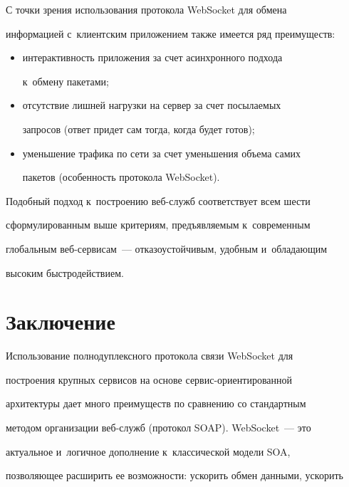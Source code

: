      


     С точки зрения использования протокола WebSocket для обмена 


информацией с~клиентским приложением также имеется ряд преимуществ:


     \begin{itemize}


     \item интерактивность приложения за счет асинхронного подхода 


к~обмену па\-ке\-тами;


     \item отсутствие лишней нагрузки на сервер за счет посылаемых 


запросов (ответ придет сам тогда, когда будет готов);


     \item уменьшение трафика по сети за счет уменьшения объема самих 


пакетов (особенность протокола WebSocket).


     \end{itemize}


     


     Подобный подход к~построению веб-служб соответствует всем шести 


сформулированным выше критериям, предъявляемым к~современным 


глобальным веб-сер\-ви\-сам~--- отказоустойчивым, удобным и~обладающим 


высоким быстродействием.


     


\section{Заключение}





    Использование полнодуплексного протокола связи WebSocket для 


построения крупных сервисов на основе сервис-ориентированной 


архитектуры дает много преимуществ по сравнению со стандартным 


методом организации веб-служб (протокол SOAP). WebSocket~--- это 


актуальное и~логичное дополнение к~классической модели SOA, 


позволяющее расширить ее возможности: ускорить обмен данными, ускорить 


